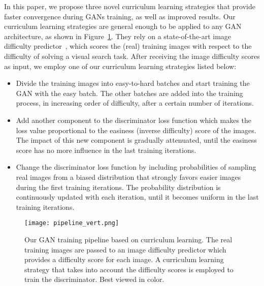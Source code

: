 \documentclass[10pt,twocolumn,letterpaper]{article}
\begin{document}
In this paper, we propose three novel curriculum learning strategies that provide faster convergence during GANs training, as well as improved results. Our curriculum learning strategies are general enough to be applied to any GAN architecture, as shown in Figure~\ref{fig_pipeline}. They rely on a state-of-the-art image difficulty predictor~\cite{Ionescu-CVPR-2016}, which scores the (real) training images with respect to the difficulty of solving a visual search task. After receiving the image difficulty scores as input, we employ one of our curriculum learning strategies listed below:
\begin{itemize}
\vspace{-0.15cm}
\item Divide the training images into  easy-to-hard batches and start training the GAN with the easy batch. The other batches are added into the training process, in increasing order of difficulty, after a certain number of iterations.
\vspace{-0.15cm}
\item Add another component to the discriminator loss function which makes the loss value proportional to the easiness (inverse difficulty) score of the images. The impact of this new component is gradually attenuated, until the easiness score has no more influence in the last training iterations.
\vspace{-0.15cm}
\item Change the discriminator loss function by including probabilities of sampling real images from a biased distribution that strongly favors easier images during the first training iterations. The probability distribution is continuously updated with each iteration, until it becomes uniform in the last training iterations.
\end{itemize}
\vspace{-0.15cm}

\begin{figure}[!t]
\begin{center}
\texttt{[image: pipeline\_vert.png]}
\end{center}
\vspace*{-0.4cm}
\caption{Our GAN training pipeline based on curriculum learning. The real training images are passed to an image difficulty predictor which provides a difficulty score for each image. A curriculum learning strategy that takes into account the difficulty scores is employed to train the discriminator. Best viewed in color.}
\label{fig_pipeline}
\vspace*{-0.5cm}
\end{figure}
\end{document}
